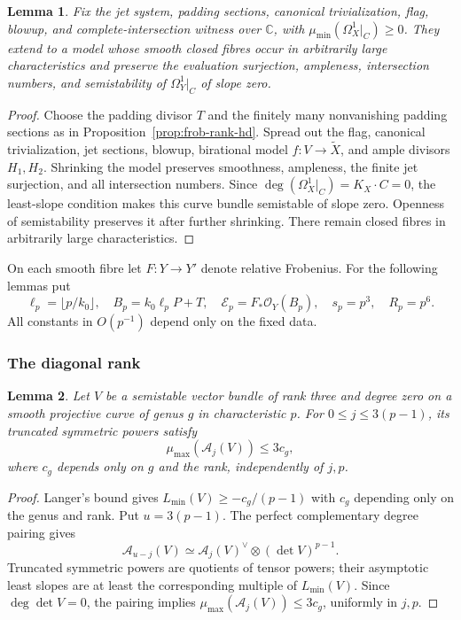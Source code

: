 \documentclass[12pt,a4paper,psamsfonts]{amsart}
\theoremstyle{definition}
\theoremstyle{plain}
\newtheorem{lemma}{Lemma}[section]
\newcommand{\C}{\mathbb C}
\newcommand{\OO}{\mathcal O}
\begin{document}
\begin{lemma}\label{lem:fixed-data-reduction}
Fix the jet system, padding sections, canonical trivialization,
flag, blowup, and complete-intersection witness over $\C$,
with $\mu_{\min}(\Omega_X^1|_C)\ge0$. They extend to a model whose smooth closed fibres occur in
arbitrarily large characteristics and preserve the evaluation
surjection, ampleness, intersection numbers, and semistability
of $\Omega_Y^1|_C$ of slope zero.
\end{lemma}
\begin{proof}
Choose the padding divisor $T$ and the finitely many nonvanishing
padding sections as in Proposition~\ref{prop:frob-rank-hd}.
Spread out the flag, canonical trivialization, jet sections,
blowup, birational model $f:V\to\widetilde X$, and ample divisors
$H_1,H_2$. Shrinking the model preserves smoothness, ampleness,
the finite jet surjection, and all intersection numbers.
Since $\deg(\Omega_X^1|_C)=K_X\cdot C=0$, the least-slope condition
makes this curve bundle semistable of slope zero. Openness of
semistability preserves it after further shrinking.
There remain closed fibres in arbitrarily large characteristics.
\end{proof}


On each smooth fibre let $F:Y\to Y'$ denote relative Frobenius.
For the following lemmas put
\[
 \ell_p=\lfloor p/k_0\rfloor,\quad B_p=k_0\ell_pP+T,\quad
 \mathcal E_p=F_*\OO_Y(B_p),\quad s_p=p^3,\quad R_p=p^6.
\]
All constants in $O(p^{-1})$ depend only on the fixed data.

\subsubsection{The diagonal rank}

\begin{lemma}\label{lem:truncated-slope-bound}
Let $V$ be a semistable vector bundle of rank three and degree
zero on a smooth projective curve of genus $g$ in characteristic
$p$. For $0\le j\le3(p-1)$, its truncated symmetric powers satisfy
\[
 \mu_{\max}(\mathcal A_j(V))\le3c_g,
\]
where $c_g$ depends only on $g$ and the rank, independently of $j,p$.
\end{lemma}
\begin{proof}
Langer's bound
\cite[Corollary~2.5]{Langer} gives
$L_{\min}(V)\ge-c_g/(p-1)$ with $c_g$ depending only on the
genus and rank. Put $u=3(p-1)$. The perfect complementary
degree pairing gives
\[
 \mathcal A_{u-j}(V)
 \simeq\mathcal A_j(V)^\vee\otimes(\det V)^{p-1}.
\]
Truncated symmetric powers are quotients of tensor powers;
their asymptotic least slopes are at least the corresponding
multiple of $L_{\min}(V)$. Since $\deg\det V=0$, the pairing
implies $\mu_{\max}(\mathcal A_j(V))\le3c_g$, uniformly in $j,p$.
\end{proof}
\end{document}
